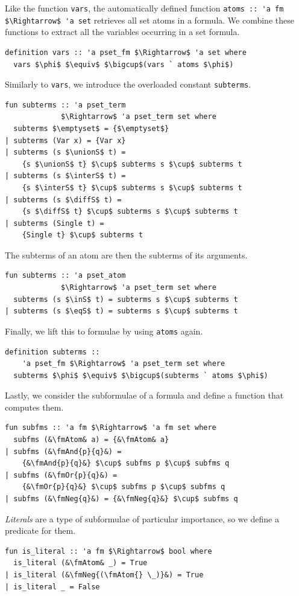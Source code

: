 \documentclass[
  sigplan,
  10pt,
  ]{acmart}
\newcommand{\unionS}{\sqcup_\text{s}}
\newcommand{\interS}{\sqcap_\text{s}}
\newcommand{\diffS}{-_\text{s}}
\newcommand{\inS}{\in_\text{s}}
\newcommand{\eqS}{=_\text{s}}
\newcommand{\fmAnd}[2]{#1 $\boldsymbol{\land}$ #2}
\newcommand{\fmOr}[2]{#1 $\boldsymbol{\lor}$ #2}
\newcommand{\fmNegSymbol}{\boldsymbol{\neg}}
\newcommand{\fmNeg}[1]{$\fmNegSymbol$ #1}
\newcommand{\fmAtom}{\textbf{A}}
\begin{document}
Like the function \lstinline!vars!, the automatically defined function \lstinline!atoms :: 'a fm $\Rightarrow$ 'a set! retrieves all set atoms in a formula.
We combine these functions to extract all the variables occurring in a set formula.
\begin{lstlisting}
definition vars :: 'a pset_fm $\Rightarrow$ 'a set where
  vars $\phi$ $\equiv$ $\bigcup$(vars ` atoms $\phi$)
\end{lstlisting}

Similarly to \lstinline!vars!, we introduce the overloaded constant \lstinline!subterms!.
\begin{lstlisting}
fun subterms :: 'a pset_term
             $\Rightarrow$ 'a pset_term set where
  subterms $\emptyset$ = {$\emptyset$}
| subterms (Var x) = {Var x}
| subterms (s $\unionS$ t) =
    {s $\unionS$ t} $\cup$ subterms s $\cup$ subterms t
| subterms (s $\interS$ t) =
    {s $\interS$ t} $\cup$ subterms s $\cup$ subterms t
| subterms (s $\diffS$ t) =
    {s $\diffS$ t} $\cup$ subterms s $\cup$ subterms t
| subterms (Single t) =
    {Single t} $\cup$ subterms t
\end{lstlisting}
The subterms of an atom are then the subterms of its arguments.
\begin{lstlisting}
fun subterms :: 'a pset_atom
             $\Rightarrow$ 'a pset_term set where
  subterms (s $\inS$ t) = subterms s $\cup$ subterms t
| subterms (s $\eqS$ t) = subterms s $\cup$ subterms t
\end{lstlisting}
Finally, we lift this to formulae by using \lstinline!atoms! again.
\begin{lstlisting}
definition subterms ::
    'a pset_fm $\Rightarrow$ 'a pset_term set where
  subterms $\phi$ $\equiv$ $\bigcup$(subterms ` atoms $\phi$)
\end{lstlisting}

Lastly, we consider the subformulae of a formula and define a function that computes them.
\begin{lstlisting}
fun subfms :: 'a fm $\Rightarrow$ 'a fm set where
  subfms (&\fmAtom& a) = {&\fmAtom& a}
| subfms (&\fmAnd{p}{q}&) =
    {&\fmAnd{p}{q}&} $\cup$ subfms p $\cup$ subfms q
| subfms (&\fmOr{p}{q}&) =
    {&\fmOr{p}{q}&} $\cup$ subfms p $\cup$ subfms q
| subfms (&\fmNeg{q}&) = {&\fmNeg{q}&} $\cup$ subfms q
\end{lstlisting}
\textit{Literals} are a type of subformulae of particular importance, so we define a predicate for them.
\begin{lstlisting}
fun is_literal :: 'a fm $\Rightarrow$ bool where
  is_literal (&\fmAtom& _) = True
| is_literal (&\fmNeg{(\fmAtom{} \_)}&) = True
| is_literal _ = False
\end{lstlisting}
\end{document}
